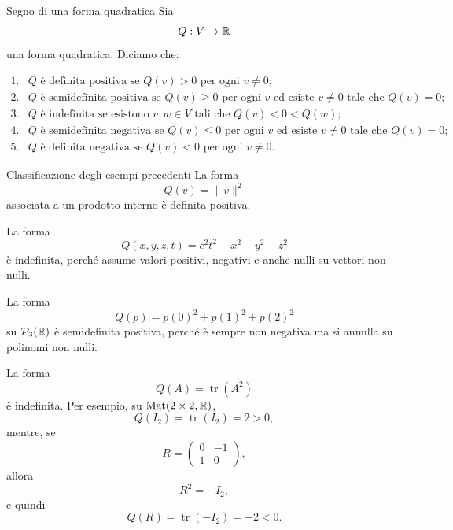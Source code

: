 \documentclass[a4paper]{article}
\begin{document}
\begin{snippetdefinition}{Segno di una forma quadratica}
    Sia
    \[
        Q:V\to\mathbb{R}
    \]
    una forma quadratica. Diciamo che:

    \[
        \begin{array}{ll}
            \text{1.} &
            Q \text{ è definita positiva se }
            Q(v)>0 \text{ per ogni } v\neq 0;\\[1mm]
            \text{2.} &
            Q \text{ è semidefinita positiva se }
            Q(v)\geq 0 \text{ per ogni } v
            \text{ ed esiste } v\neq 0 \text{ tale che } Q(v)=0;\\[1mm]
            \text{3.} &
            Q \text{ è indefinita se esistono } v,w\in V
            \text{ tali che } Q(v)<0<Q(w);\\[1mm]
            \text{4.} &
            Q \text{ è semidefinita negativa se }
            Q(v)\leq 0 \text{ per ogni } v
            \text{ ed esiste } v\neq 0 \text{ tale che } Q(v)=0;\\[1mm]
            \text{5.} &
            Q \text{ è definita negativa se }
            Q(v)<0 \text{ per ogni } v\neq 0.
        \end{array}
    \]
\end{snippetdefinition}

\begin{snippetexample}{Classificazione degli esempi precedenti}
    La forma
    \[
        Q(v)=\|v\|^2
    \]
    associata a un prodotto interno è definita positiva.

    La forma
    \[
        Q(x,y,z,t)=c^2t^2-x^2-y^2-z^2
    \]
    è indefinita, perché assume valori positivi, negativi e anche nulli su vettori non nulli.

    La forma
    \[
        Q(p)=p(0)^2+p(1)^2+p(2)^2
    \]
    su \(\mathcal{P}_3(\mathbb{R})\) è semidefinita positiva, perché è sempre non negativa ma si annulla su polinomi non nulli.

    La forma
    \[
        Q(A)=\operatorname{tr}(A^2)
    \]
    è indefinita. Per esempio, su \(\operatorname{Mat}(2\times 2,\mathbb{R})\),
    \[
        Q(I_2)=\operatorname{tr}(I_2)=2>0,
    \]
    mentre, se
    \[
        R=
        \begin{pmatrix}
            0 & -1\\
            1 & 0
        \end{pmatrix},
    \]
    allora
    \[
        R^2=-I_2,
    \]
    e quindi
    \[
        Q(R)=\operatorname{tr}(-I_2)=-2<0.
    \]
\end{snippetexample}
\end{document}
